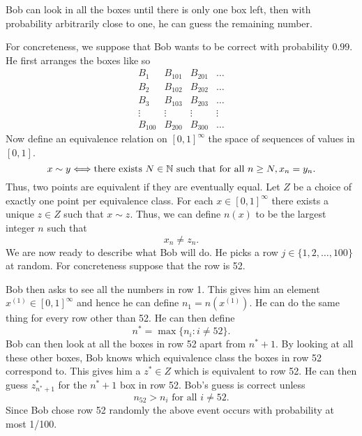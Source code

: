 \begin{claim}
    Bob can look in all the boxes until there is only one box left, then with probability arbitrarily close to one, he can guess the remaining number.
\end{claim}
For concreteness, we suppose that Bob wants to be correct with probability $0.99$. He first arranges the boxes like so 
\[\begin{matrix}
    B_1&B_{101}&B_{201}&\ldots \\
    B_2&B_{102}&B_{202}&\ldots \\
    B_3&B_{103}&B_{203}&\ldots \\
    \vdots&\vdots&\vdots&\vdots \\
    B_{100}&B_{200}&B_{300}&\ldots 
\end{matrix} \]
Now define an equivalence relation on $[0,1]^\infty$ the space of sequences of values in $[0,1]$. 
\[x \sim y \Longleftrightarrow \text{there exists } N \in {{\mathbb N}} \text{ such that for all } n \ge N, x_n = y_n. \]
Thus, two points are equivalent if they are eventually equal. Let $Z$ be a choice of exactly one point per equivalence class. For each $x \in [0,1]^\infty$ there exists a unique $z \in Z$ such that $x \sim z$. Thus, we can define $n(x)$ to be the largest integer $n$ such that 
\[x_n \neq z_n. \]
We are now ready to describe what Bob will do. He picks a row $j \in \{1,2,\ldots,100\}$ at random. For concreteness suppose that the row is 52. 

Bob then asks to see all the numbers in row 1. This gives him an element $x^{(1)} \in [0,1]^\infty$ and hence he can define $n_1 = n(x^{(1)})$. He can do the same thing for every row other than 52. He can then define
\[n^* = \max\{n_i : i \neq 52\}. \]
Bob can then look at all the boxes in row 52 apart from $n^*+1$. By looking at all these other boxes, Bob knows which equivalence class the boxes in row 52 correspond to. This gives him a $z^* \in Z$ which is equivalent to row 52. He can then guess $z^*_{n^*+1}$ for the $n^*+1$ box in row 52. Bob's guess is correct unless
\[n_{52} > n_i \text{ for all } i \neq 52. \]
Since Bob chose row 52 randomly the above event occurs with probability at most 1/100.
